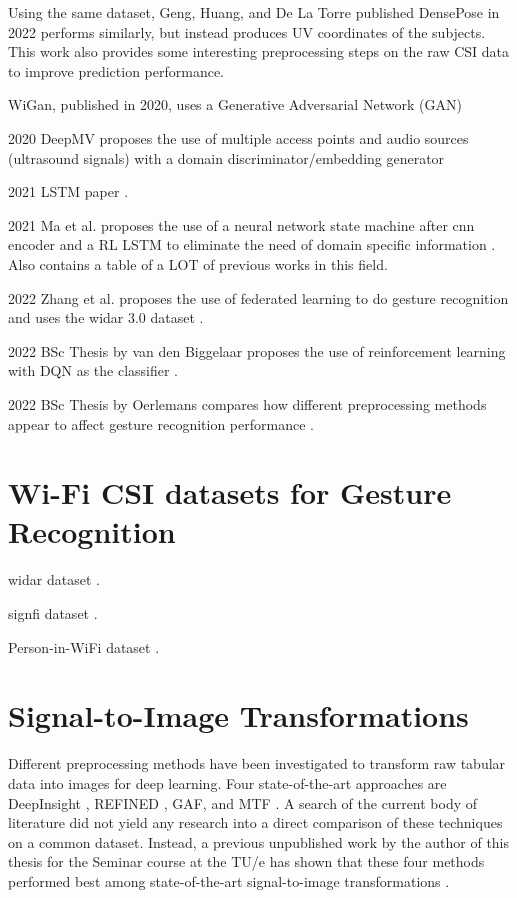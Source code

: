 Using the same dataset, Geng, Huang, and De La Torre published DensePose in 2022 performs similarly, but instead produces UV coordinates of the subjects.
This work also provides some interesting preprocessing steps on the raw CSI data to improve prediction performance.

WiGan, published in 2020, uses a Generative Adversarial Network (GAN) 

2020 DeepMV proposes the use of multiple access points \cite{xue2020deepmv} and audio sources (ultrasound signals) with a domain discriminator/embedding generator

2021 LSTM paper \cite{zhuravchak2022human}.

2021 Ma et al. proposes the use of a neural network state machine after cnn encoder and a RL LSTM to eliminate the need of domain specific information \cite{ma2021location}.
Also contains a table of a LOT of previous works in this field.

2022 Zhang et al. proposes the use of federated learning to do gesture recognition and uses the widar 3.0 dataset \cite{zhang2022wifi}.

2022 BSc Thesis by van den Biggelaar proposes the use of reinforcement learning with DQN as the classifier \cite{biggelaar2022gesture}.

2022 BSc Thesis by Oerlemans compares how different preprocessing methods appear to affect gesture recognition performance \cite{oerlemans2022effect}.

\section{Wi-Fi CSI datasets for Gesture Recognition}

widar dataset \cite{zheng2019zero}.

signfi dataset \cite{ma2018signfi}.

Person-in-WiFi dataset \cite{wang2019person}.

\section{Signal-to-Image Transformations}

Different preprocessing methods have been investigated to transform raw tabular data into images for deep learning.
Four state-of-the-art approaches are DeepInsight \cite{sharma2019deepinsight}, REFINED \cite{bazgir2020representation}, GAF, and MTF \cite{wang2015imaging}.
A search of the current body of literature did not yield any research into a direct comparison of these techniques on a common dataset.
Instead, a previous unpublished work by the author of this thesis for the Seminar course at the TU/e has shown that these four methods performed best among state-of-the-art signal-to-image transformations \cite{satyawan2023cnns}.

